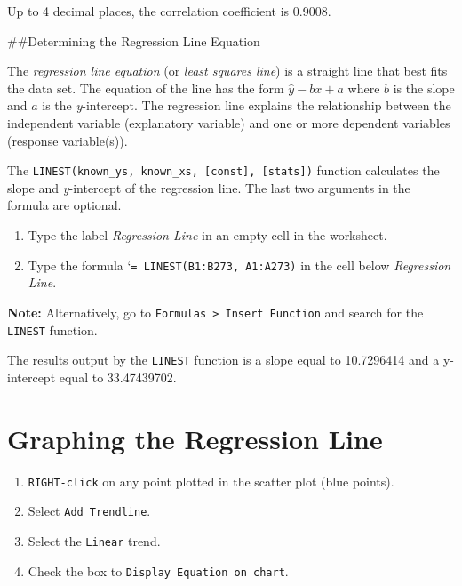 \documentclass[
  12pt,
  letterpaper,
]{book}
\providecommand{\tightlist}{%
  \setlength{\itemsep}{0pt}\setlength{\parskip}{0pt}}
\begin{document}
Up to 4 decimal places, the correlation coefficient is 0.9008.

\#\#Determining the Regression Line Equation

The \emph{regression line equation} (or \emph{least squares line}) is a straight line that best fits the data set. The equation of the line has the form \(\hat{y}-bx+a\) where \(b\) is the slope and \(a\) is the \emph{y}-intercept. The regression line explains the relationship between the independent variable (explanatory variable) and one or more dependent variables (response variable(s)).

The \texttt{LINEST(known\_y\textquotesingle{}s,\ known\_x\textquotesingle{}s,\ {[}const{]},\ {[}stats{]})} function calculates the slope and \emph{y}-intercept of the regression line. The last two arguments in the formula are optional.

\begin{enumerate}
\def\labelenumi{\arabic{enumi}.}
\tightlist
\item
  Type the label \emph{Regression Line} in an empty cell in the worksheet.
\item
  Type the formula `\texttt{=\ LINEST(B1:B273,\ A1:A273)} in the cell below \emph{Regression Line}.
\end{enumerate}

\textbf{Note:} Alternatively, go to \texttt{Formulas\ \textgreater{}\ Insert\ Function} and search for the \texttt{LINEST} function.

The results output by the \texttt{LINEST} function is a slope equal to 10.7296414 and a y-intercept equal to 33.47439702.

\hypertarget{graphing-the-regression-line}{%
\section{Graphing the Regression Line}\label{graphing-the-regression-line}}

\begin{enumerate}
\def\labelenumi{\arabic{enumi}.}
\tightlist
\item
  \texttt{RIGHT-click} on any point plotted in the scatter plot (blue points).
\item
  Select \texttt{Add\ Trendline}.
\item
  Select the \texttt{Linear} trend.
\item
  Check the box to \texttt{Display\ Equation\ on\ chart}.
\end{enumerate}
\end{document}
